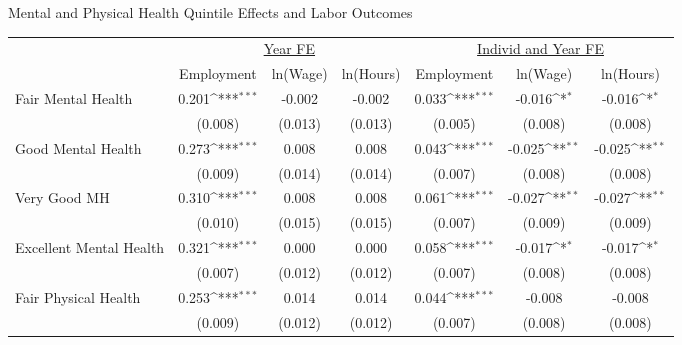 \def\sym#1{\ifmmode^{#1}\else\(^{#1}\)\fi}
\caption{Mental and Physical Health Quintile Effects and Labor Outcomes}
\footnotesize\begin{tabular}{l*{6}{c}}
                    &\multicolumn{3}{c}{\underline{Year FE}}                          &\multicolumn{3}{c}{\underline{Individ and Year FE}}              \\\cmidrule(lr){2-4}\cmidrule(lr){5-7}
                    &\multicolumn{1}{c}{Employment}&\multicolumn{1}{c}{ln(Wage)}&\multicolumn{1}{c}{ln(Hours)}&\multicolumn{1}{c}{Employment}&\multicolumn{1}{c}{ln(Wage)}&\multicolumn{1}{c}{ln(Hours)}\\
\hline
Fair Mental Health  &       0.201\sym{***}&      -0.002         &      -0.002         &       0.033\sym{***}&      -0.016\sym{*}  &      -0.016\sym{*}  \\
                    &     (0.008)         &     (0.013)         &     (0.013)         &     (0.005)         &     (0.008)         &     (0.008)         \\
Good Mental Health  &       0.273\sym{***}&       0.008         &       0.008         &       0.043\sym{***}&      -0.025\sym{**} &      -0.025\sym{**} \\
                    &     (0.009)         &     (0.014)         &     (0.014)         &     (0.007)         &     (0.008)         &     (0.008)         \\
Very Good MH        &       0.310\sym{***}&       0.008         &       0.008         &       0.061\sym{***}&      -0.027\sym{**} &      -0.027\sym{**} \\
                    &     (0.010)         &     (0.015)         &     (0.015)         &     (0.007)         &     (0.009)         &     (0.009)         \\
Excellent Mental Health&       0.321\sym{***}&       0.000         &       0.000         &       0.058\sym{***}&      -0.017\sym{*}  &      -0.017\sym{*}  \\
                    &     (0.007)         &     (0.012)         &     (0.012)         &     (0.007)         &     (0.008)         &     (0.008)         \\
Fair Physical Health&       0.253\sym{***}&       0.014         &       0.014         &       0.044\sym{***}&      -0.008         &      -0.008         \\
                    &     (0.009)         &     (0.012)         &     (0.012)         &     (0.007)         &     (0.008)         &     (0.008)         \\

\end{tabular}
